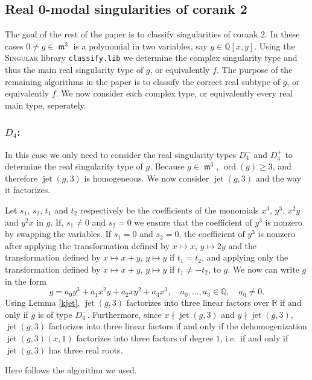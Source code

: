 \documentclass[noend]{amsproc}
\DeclareMathOperator{\ord}{ord}
\DeclareMathOperator{\m}{\mathfrak{m}}
\DeclareMathOperator{\jt}{jet}
\begin{document}
\subsection{Real $\mathbf 0$-modal singularities of corank $\mathbf 2$}
The goal of the rest of the paper is to classify singularities of corank $2$.
In these cases $0\neq g\in\m^3$ is a polynomial in two variables, say
$g\in\mathbb Q[x,y]$. Using the \textsc{Singular} library {\tt classify.lib} we
determine the complex singularity type and thus the main real singularity type
of $g$, or equivalently $f$. The purpose of the remaining algorithms in the
paper is to classify the correct real subtype of $g$, or equivalently $f$. We
now consider each complex type, or equivalently every real main type,
seperately.

\subsubsection{$ D_4$:}In this case we only need
to consider the real singularity types $D_4^-$ and $D_4^+$ to determine the
real singularity type of $g$. Because $g\in \m^3$, $\ord(g)\ge3$,
and therefore $\jt(g,3)$ is homogeneous. We now consider
$\jt(g,3)$ and the way it factorizes.

Let $s_1$, $s_2$, $t_1$ and $t_2$  respectively be the coefficients of the
monomials $x^3$, $y^3$, $x^2y$ and $y^2x$ in $g$. If, $s_1\neq 0$ and $s_2=0$
we ensure that the coefficient of $y^3$ is
nonzero by swapping the variables. If $s_1=0$ and $s_2=0$, the coefficient
of $y^3$ is nonzero after applying the transformation defined by $x\mapsto x$,
$y\mapsto 2y$ and the transformation defined by $x\mapsto
x+y$, $y\mapsto y$ if $t_1=t_2$, and applying only the transformation defined
by $x\mapsto x+y$, $y\mapsto
y$ if $t_1\neq -t_2$, to $g$. We now can write $g$ in the form
\begin{equation*}
g=a_0y^3+a_1x^2y+a_2xy^2+a_3x^3,\quad a_0,\ldots,a_3\in\mathbb Q,
\quad a_0\neq 0.
\end{equation*}
Using Lemma \ref{kjet}, $\jt(g,3)$ factorizes into three linear factors over
$\mathbb R$ if and only if $g$ is of type $D_4^-$. Furthermore, since
$x\nmid
\jt(g,3)$ and $y\nmid \jt(g,3)$, $\jt(g,3)$ factorizes into three linear
factors if and only if
the dehomogenization $\jt(g,3)(x,1)$ factorizes into three factors of degree
$1$, i.e.~if and only if $\jt(g,3)$ has three real roots.

Here follows the algorithm we used.
\end{document}
